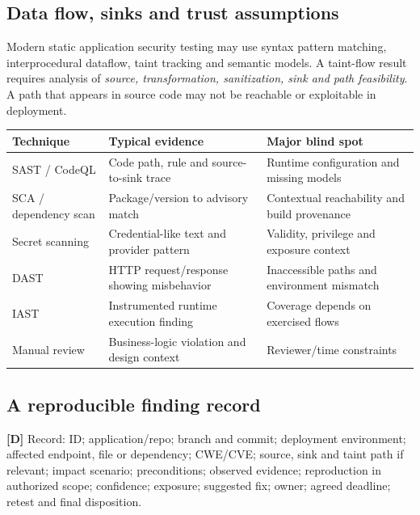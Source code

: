 \documentclass[10pt,letterpaper,oneside]{article}
\newcommand{\designed}{\textsf{\color{accent}\textbf{[D]}}}
\begin{document}
\subsection{Data flow, sinks and trust assumptions}
Modern static application security testing may use syntax pattern matching, interprocedural dataflow, taint tracking and semantic models. A taint-flow result requires analysis of \emph{source, transformation, sanitization, sink and path feasibility}. A path that appears in source code may not be reachable or exploitable in deployment.
\par\medskip\noindent\begin{tabularx}{\textwidth}{@{}p{}X X@{}}\toprule
Technique & Typical evidence & Major blind spot \\ \midrule
SAST / CodeQL & Code path, rule and source-to-sink trace & Runtime configuration and missing models\\
SCA / dependency scan & Package/version to advisory match & Contextual reachability and build provenance\\
Secret scanning & Credential-like text and provider pattern & Validity, privilege and exposure context\\
DAST & HTTP request/response showing misbehavior & Inaccessible paths and environment mismatch\\
IAST & Instrumented runtime execution finding & Coverage depends on exercised flows\\
Manual review & Business-logic violation and design context & Reviewer/time constraints\\
\bottomrule\end{tabularx}\par\medskip
\subsection{A reproducible finding record}\designed{}
Record: ID; application/repo; branch and commit; deployment environment; affected endpoint, file or dependency; CWE/CVE; source, sink and taint path if relevant; impact scenario; preconditions; observed evidence; reproduction in authorized scope; confidence; exposure; suggested fix; owner; agreed deadline; retest and final disposition.
\end{document}
